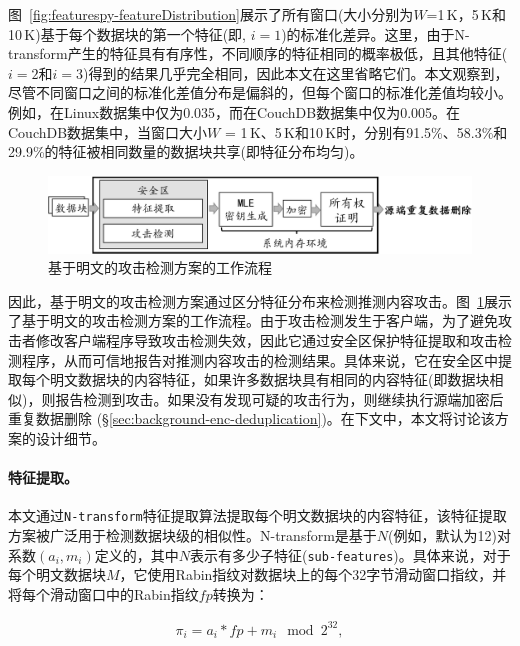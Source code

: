 图~\ref{fig:featurespy-featureDistribution}展示了所有窗口(大小分别为$W$=1\,K，5\,K和10\,K)基于每个数据块的第一个特征(即, $i = 1$)的标准化差异。这里，由于N-transform产生的特征具有有序性，不同顺序的特征相同的概率极低，且其他特征($i = 2$和$i = 3$)得到的结果几乎完全相同，因此本文在这里省略它们。本文观察到，尽管不同窗口之间的标准化差值分布是偏斜的，但每个窗口的标准化差值均较小。例如，在Linux数据集中仅为0.035，而在CouchDB数据集中仅为0.005。在CouchDB数据集中，当窗口大小$W$ = 1\,K、5\,K和10\,K时，分别有91.5\%、58.3\%和29.9\%的特征被相同数量的数据块共享(即特征分布均匀)。

\begin{figure}[!htb]
    \centering
    \includegraphics[width=\textwidth]{pic/featurespy/naive.pdf}
    \caption{基于明文的攻击检测方案的工作流程}
    \label{fig:featurespy-architecture-strawman}
\end{figure}

因此，基于明文的攻击检测方案通过区分特征分布来检测推测内容攻击。图~\ref{fig:featurespy-architecture-strawman}展示了基于明文的攻击检测方案的工作流程。由于攻击检测发生于客户端，为了避免攻击者修改客户端程序导致攻击检测失效，因此它通过安全区保护特征提取和攻击检测程序，从而可信地报告对推测内容攻击的检测结果。具体来说，它在安全区中提取每个明文数据块的内容特征，如果许多数据块具有相同的内容特征(即数据块相似)，则报告检测到攻击。如果没有发现可疑的攻击行为，则继续执行源端加密后重复数据删除 (\S\ref{sec:background-enc-deduplication})。在下文中，本文将讨论该方案的设计细节。

\paragraph*{特征提取。}
本文通过{\tt N-transform}\cite{shilane12}特征提取算法提取每个明文数据块的内容特征，该特征提取方案被广泛用于检测数据块级的相似性。N-transform是基于$N$(例如，默认为12)对系数$(a_i, m_i)$定义的，其中$N$表示有多少子特征({\tt sub-features})。具体来说，对于每个明文数据块$M$，它使用Rabin指纹\cite{rabin81}对数据块上的每个32字节滑动窗口指纹，并将每个滑动窗口中的Rabin指纹$fp$转换为：

\begin{eqnarray}
    \label{eq:featurespy-feature}
    \pi_i = a_i * fp + m_i \mod 2^{32},
\end{eqnarray}

